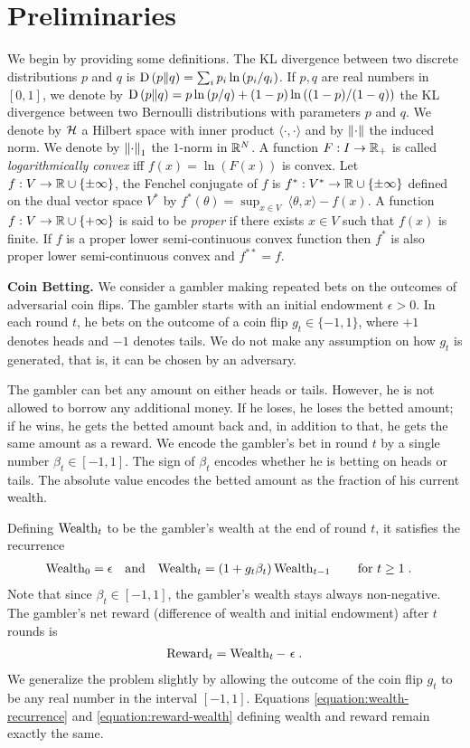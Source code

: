 \section{Preliminaries}
\label{section:preliminaries}

We begin by providing some definitions.  The \ac{KL} divergence between two
discrete distributions $p$ and $q$ is $\operatorname{D}\left({p}\middle\|{q}\right) = \sum_{i} p_i \ln\left(
p_i/q_i \right)$. If $p,q$ are real numbers in $[0,1]$, we denote by $\operatorname{D}\left({p}\middle\|{q}\right)
= p \ln \left(p/q \right) + (1-p) \ln \left((1-p)/(1-q) \right)$ the \ac{KL}
divergence between two Bernoulli distributions with parameters $p$ and $q$.  We
denote by $\mathcal{H}$ a Hilbert space with inner product $\langle \cdot, \cdot\rangle$
and by $\left\|{\cdot}\right\|$ the induced norm.  We denote by $\left\|{\cdot}\right\|_1$ the
$1$-norm in $\mathbb{R}^N$.  A function $F:I \to \mathbb{R}_+$ is called \emph{logarithmically
convex} iff $f(x) = \ln(F(x))$ is convex.  Let $f:V \to \mathbb{R} \cup \{\pm\infty\}$,
the Fenchel conjugate of $f$ is $f^*:V^* \to \mathbb{R} \cup \{\pm \infty\}$ defined on
the dual vector space $V^*$ by $f^*(\theta) = \sup_{x \in V} \ \langle \theta,
x \rangle - f(x)$.  A function $f:V \to \mathbb{R} \cup \{+\infty\}$ is said to be
\emph{proper} if there exists $x \in V$ such that $f(x)$ is finite.  If $f$ is
a proper lower semi-continuous convex function then $f^*$ is also proper lower
semi-continuous convex and $f^{**}=f$.

\textbf{Coin Betting.} We consider a gambler making repeated bets on the
outcomes of adversarial coin flips. The gambler starts with an initial
endowment $\epsilon > 0$. In each round $t$, he bets on the outcome of a coin
flip $g_t \in \{-1,1\}$, where $+1$ denotes heads and $-1$ denotes tails.  We
do not make any assumption on how $g_t$ is generated, that is, it can be chosen
by an adversary.

The gambler can bet any amount on either heads or tails. However, he is not
allowed to borrow any additional money. If he loses, he loses the betted
amount; if he wins, he gets the betted amount back and, in addition to that, he
gets the same amount as a reward.  We encode the gambler's bet in round $t$ by a
single number $\beta_t \in [-1,1]$. The sign of $\beta_t$ encodes whether he is
betting on heads or tails. The absolute value encodes the betted amount as the
fraction of his current wealth.

Defining $\operatorname{Wealth}_t$ to be the gambler's wealth at the end of round $t$, it
satisfies the recurrence
\begin{align}
\label{equation:wealth-recurrence}
\operatorname{Wealth}_0 & = \epsilon &
& \text{and} &
\operatorname{Wealth}_t & = (1 + g_t \beta_t) \operatorname{Wealth}_{t-1} \qquad \text{for $t \ge 1$} \; .
\end{align}
Note that since $\beta_t \in [-1,1]$, the gambler's wealth stays always
non-negative.  The gambler's net reward (difference of wealth and initial
endowment) after $t$ rounds is
\begin{align}
\label{equation:reward-wealth}
\operatorname{Reward}_t = \operatorname{Wealth}_t - \ \epsilon \; .
\end{align}
We generalize the problem slightly by allowing the outcome of the coin flip
$g_t$ to be any real number in the interval $[-1,1]$.  Equations
\eqref{equation:wealth-recurrence} and \eqref{equation:reward-wealth} defining
wealth and reward remain exactly the same.

